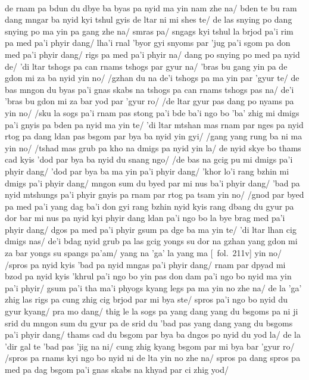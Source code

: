 \documentclass[12pt]{article}
\begin{document}
\textbf{\TVA}\\
de rnam pa bdun du dbye ba byas pa nyid ma yin nam zhe na/ bden te bu ram dang mngar ba nyid kyi tshul gyis de ltar ni mi shes te/ de las snying po dang snying po ma yin pa gang zhe na/ smras pa/ sngags kyi tshul la brjod pa'i rim pa med pa'i phyir dang/ lha'i rnal 'byor gyi snyoms par 'jug pa'i sgom pa don med pa'i phyir dang/ rigs pa med pa'i phyir na/ dang po snying po med pa nyid de/ 'di ltar tshogs pa can rnams tshogs par gyur na/ 'bras bu gang yin pa de gdon mi za ba nyid yin no/ /gzhan du na de'i tshogs pa ma yin par 'gyur te/ de bas mngon du byas pa'i gnas skabs na tshogs pa can rnams tshogs pas na/ de'i 'bras bu gdon mi za bar yod par 'gyur ro/ /de ltar gyur pas dang po nyams pa yin no/ /sku la sogs pa'i rnam pas stong pa'i bde ba'i ngo bo 'ba' zhig mi dmigs pa'i gnyis pa bden pa nyid ma yin te/ 'di ltar mtshan mas rnam par nges pa nyid rtog pa dang ldan pas bsgom par bya ba nyid yin gyi/ /gang yang rung ba ni ma yin no/ /tshad mas grub pa kho na dmigs pa nyid yin la/ de nyid skye bo thams cad kyis 'dod par bya ba nyid du snang ngo/ /de bas na gcig pu mi dmigs pa'i phyir dang/ 'dod par bya ba ma yin pa'i phyir dang/ 'khor lo'i rang bzhin mi dmigs pa'i phyir dang/ mngon sum du byed par mi nus ba'i phyir dang/ 'bad pa nyid mtshungs pa'i phyir gnyis pa rnam par rtog pa tsam yin no/ /gnod par byed pa med pa'i yang dag ba'i don gyi rang bzhin nyid kyis rang dbang du gyur pa dor bar mi nus pa nyid kyi phyir dang ldan pa'i ngo bo la bye brag med pa'i phyir dang/ dgos pa med pa'i phyir gsum pa dge ba ma yin te/ 'di ltar lhan cig dmigs nas/ de'i bdag nyid grub pa las gcig yongs su dor na gzhan yang gdon mi za bar yongs su spangs pa'am/ yang na 'ga' la yang ma [\TVA\ fol.\ 211v] yin no/ /spros pa nyid kyis 'bad pa nyid mngas pa'i phyir dang/ rnam par dpyad mi bzod pa nyid kyis 'khrul pa'i ngo bo yin pas don dam pa'i ngo bo nyid ma yin pa'i phyir/ gsum pa'i tha ma'i phyogs kyang legs pa ma yin no zhe na/ de la 'ga' zhig las rigs pa cung zhig cig brjod par mi bya ste/ spros pa'i ngo bo nyid du gyur kyang/ pra mo dang/ thig le la sogs pa yang dang yang du bsgoms pa ni ji srid du mngon sum du gyur pa de srid du 'bad pas yang dang yang du bsgoms pa'i phyir dang/ thams cad du bsgom par bya ba dngos po nyid du yod la/ de la 'dir gal te 'bad pas 'jig na ni/ cung zhig kyang bsgom par mi bya bar 'gyur ro/ /spros pa rnams kyi ngo bo nyid ni de lta yin no zhe na/ spros pa dang spros pa med pa dag bsgom pa'i gnas skabs na khyad par ci zhig yod/\\
\end{document}
